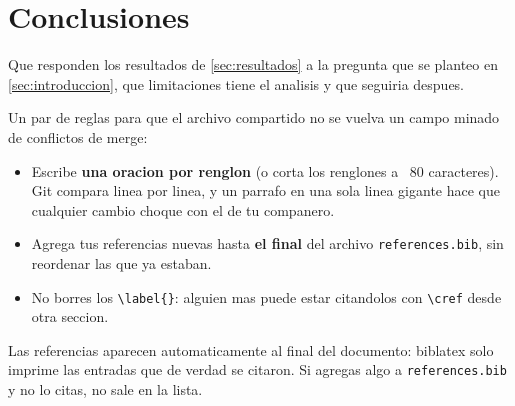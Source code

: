 
\section{Conclusiones}\label{sec:conclusiones}

Que responden los resultados de \cref{sec:resultados} a la pregunta que se
planteo en \cref{sec:introduccion}, que limitaciones tiene el analisis y que
seguiria despues.

Un par de reglas para que el archivo compartido no se vuelva un campo minado de
conflictos de merge:

\begin{itemize}
  \item Escribe \textbf{una oracion por renglon} (o corta los renglones a ~80
    caracteres). Git compara linea por linea, y un parrafo en una sola linea
    gigante hace que cualquier cambio choque con el de tu companero.
  \item Agrega tus referencias nuevas hasta \textbf{el final} del archivo
    \texttt{references.bib}, sin reordenar las que ya estaban.
  \item No borres los \verb|\label{}|: alguien mas puede estar citandolos con
    \verb|\cref| desde otra seccion.
\end{itemize}

Las referencias aparecen automaticamente al final del documento: biblatex solo
imprime las entradas que de verdad se citaron. Si agregas algo a
\texttt{references.bib} y no lo citas, no sale en la lista.
